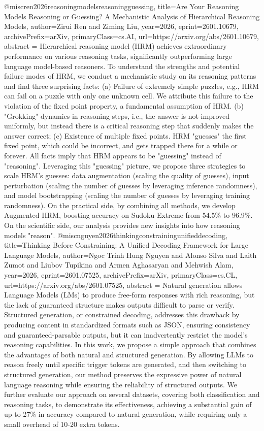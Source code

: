 {}@misc{ren2026reasoningmodelsreasoningguessing,
      title={Are Your Reasoning Models Reasoning or Guessing? A Mechanistic Analysis of Hierarchical Reasoning Models}, 
      author={Zirui Ren and Ziming Liu},
      year={2026},
      eprint={2601.10679},
      archivePrefix={arXiv},
      primaryClass={cs.AI},
      url={https://arxiv.org/abs/2601.10679},
      abstract = {Hierarchical reasoning model (HRM) achieves extraordinary performance on various reasoning tasks, significantly outperforming large language model-based reasoners. To understand the strengths and potential failure modes of HRM, we conduct a mechanistic study on its reasoning patterns and find three surprising facts: (a) Failure of extremely simple puzzles, e.g., HRM can fail on a puzzle with only one unknown cell. We attribute this failure to the violation of the fixed point property, a fundamental assumption of HRM. (b) "Grokking" dynamics in reasoning steps, i.e., the answer is not improved uniformly, but instead there is a critical reasoning step that suddenly makes the answer correct; (c) Existence of multiple fixed points. HRM "guesses" the first fixed point, which could be incorrect, and gets trapped there for a while or forever. All facts imply that HRM appears to be "guessing" instead of "reasoning". Leveraging this "guessing" picture, we propose three strategies to scale HRM's guesses: data augmentation (scaling the quality of guesses), input perturbation (scaling the number of guesses by leveraging inference randomness), and model bootstrapping (scaling the number of guesses by leveraging training randomness). On the practical side, by combining all methods, we develop Augmented HRM, boosting accuracy on Sudoku-Extreme from 54.5\% to 96.9\%. On the scientific side, our analysis provides new insights into how reasoning models "reason".}
}@misc{nguyen2026thinkingconstrainingunifieddecoding,
      title={Thinking Before Constraining: A Unified Decoding Framework for Large Language Models}, 
      author={Ngoc Trinh Hung Nguyen and Alonso Silva and Laith Zumot and Liubov Tupikina and Armen Aghasaryan and Mehwish Alam},
      year={2026},
      eprint={2601.07525},
      archivePrefix={arXiv},
      primaryClass={cs.CL},
      url={https://arxiv.org/abs/2601.07525},
      abstract = {Natural generation allows Language Models (LMs) to produce free-form responses with rich reasoning, but the lack of guaranteed structure makes outputs difficult to parse or verify. Structured generation, or constrained decoding, addresses this drawback by producing content in standardized formats such as JSON, ensuring consistency and guaranteed-parsable outputs, but it can inadvertently restrict the model's reasoning capabilities. In this work, we propose a simple approach that combines the advantages of both natural and structured generation. By allowing LLMs to reason freely until specific trigger tokens are generated, and then switching to structured generation, our method preserves the expressive power of natural language reasoning while ensuring the reliability of structured outputs. We further evaluate our approach on several datasets, covering both classification and reasoning tasks, to demonstrate its effectiveness, achieving a substantial gain of up to 27\% in accuracy compared to natural generation, while requiring only a small overhead of 10-20 extra tokens.}
}
